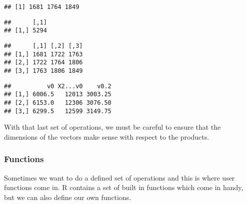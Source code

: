 \documentclass[]{article}
\newenvironment{Shaded}{\begin{snugshade}}{\end{snugshade}}
\newcommand{\CommentTok}[1]{\textcolor[rgb]{0.56,0.35,0.01}{\textit{#1}}}
\newcommand{\KeywordTok}[1]{\textcolor[rgb]{0.13,0.29,0.53}{\textbf{#1}}}
\newcommand{\NormalTok}[1]{#1}
\newcommand{\OperatorTok}[1]{\textcolor[rgb]{0.81,0.36,0.00}{\textbf{#1}}}
\newcommand{\StringTok}[1]{\textcolor[rgb]{0.31,0.60,0.02}{#1}}
\begin{document}
\begin{verbatim}
## [1] 1681 1764 1849
\end{verbatim}

\begin{Shaded}
\end{Shaded}

\begin{verbatim}
##      [,1]
## [1,] 5294
\end{verbatim}

\begin{Shaded}
\end{Shaded}

\begin{verbatim}
##      [,1] [,2] [,3]
## [1,] 1681 1722 1763
## [2,] 1722 1764 1806
## [3,] 1763 1806 1849
\end{verbatim}

\begin{Shaded}
\end{Shaded}

\begin{verbatim}
##          v0 X2...v0    v0.2
## [1,] 6006.5   12013 3003.25
## [2,] 6153.0   12306 3076.50
## [3,] 6299.5   12599 3149.75
\end{verbatim}

With that last set of operations, we must be careful to ensure that the
dimensions of the vectors make sense with respect to the products.

\hypertarget{functions}{%
\subsubsection{Functions}\label{functions}}

Sometimes we want to do a defined set of operations and this is where
user functions come in. R contains a set of built in functions which
come in handy, but we can also define our own functions.
\end{document}
